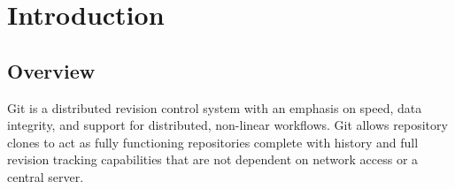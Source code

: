 \section{Introduction}
\subsection{Overview}
Git is a distributed revision control system with an emphasis on speed, data
integrity, and support for distributed, non-linear workflows.  Git allows
repository clones to act as fully functioning repositories complete with history
and full revision tracking capabilities that are not dependent on network access
or a central server.

